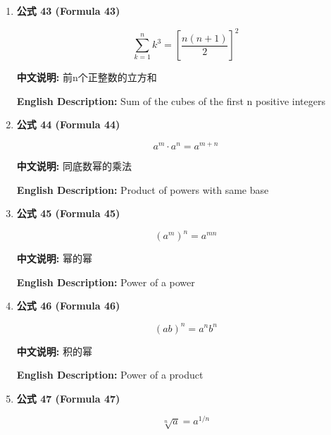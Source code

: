 \documentclass[12pt,a4paper]{article}
\begin{document}
\begin{enumerate}[leftmargin=*]
\vspace{0.5cm}

\item \textbf{公式 43 (Formula 43)}

\begin{equation}
\sum_{k=1}^{n} k^3 = \left[\frac{n(n+1)}{2}\right]^2
\end{equation}

\textbf{中文说明:} 前n个正整数的立方和

\textbf{English Description:} Sum of the cubes of the first n positive integers

\vspace{0.5cm}

\item \textbf{公式 44 (Formula 44)}

\begin{equation}
a^m \cdot a^n = a^{m+n}
\end{equation}

\textbf{中文说明:} 同底数幂的乘法

\textbf{English Description:} Product of powers with same base

\vspace{0.5cm}

\item \textbf{公式 45 (Formula 45)}

\begin{equation}
(a^m)^n = a^{mn}
\end{equation}

\textbf{中文说明:} 幂的幂

\textbf{English Description:} Power of a power

\vspace{0.5cm}

\item \textbf{公式 46 (Formula 46)}

\begin{equation}
(ab)^n = a^n b^n
\end{equation}

\textbf{中文说明:} 积的幂

\textbf{English Description:} Power of a product

\vspace{0.5cm}

\item \textbf{公式 47 (Formula 47)}

\begin{equation}
\sqrt[n]{a} = a^{1/n}
\end{equation}


\end{enumerate}
\end{document}
